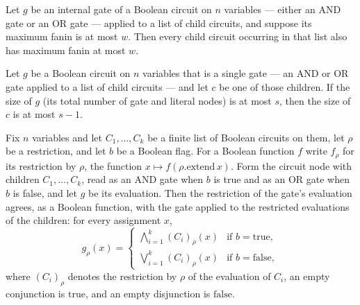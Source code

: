 \begin{lemma}
\label{LMN.children_maxFanin_le}
\leanok
{}
Let $g$ be an internal gate of a Boolean circuit on $n$ variables — either an AND gate
or an OR gate — applied to a list of child circuits, and suppose its maximum fanin is at
most $w$. Then every child circuit occurring in that list also has maximum fanin at most
$w$.
\end{lemma}

\begin{lemma}
\label{LMN.child_size_le_parent}
\leanok
{}
Let $g$ be a Boolean circuit on $n$ variables that is a single gate — an AND or OR gate
applied to a list of child circuits — and let $c$ be one of those children. If the size
of $g$ (its total number of gate and literal nodes) is at most $s$, then the size of $c$
is at most $s - 1$.
\end{lemma}

\begin{lemma}
\label{LMN.restrictFn_node_eval}
\leanok
{}
Fix $n$ variables and let $C_1,\dots,C_k$ be a finite list of Boolean circuits on them,
let $\rho$ be a restriction, and let $b$ be a Boolean flag. For a Boolean function $f$
write $f_\rho$ for its restriction by $\rho$, the function $x \mapsto
f(\rho.\mathrm{extend}\,x)$. Form the circuit node with children $C_1,\dots,C_k$, read
as an AND gate when $b$ is true and as an OR gate when $b$ is false, and let $g$ be its
evaluation. Then the restriction of the gate's evaluation agrees, as a Boolean function,
with the gate applied to the restricted evaluations of the children: for every
assignment $x$,
\[
g_\rho(x) =
\begin{cases}
\displaystyle\bigwedge_{i=1}^{k} (C_i)_\rho(x) & \text{if } b = \mathrm{true},\\[1ex]
\displaystyle\bigvee_{i=1}^{k} (C_i)_\rho(x) & \text{if } b = \mathrm{false},
\end{cases}
\]
where $(C_i)_\rho$ denotes the restriction by $\rho$ of the evaluation of $C_i$, an
empty conjunction is $\mathrm{true}$, and an empty disjunction is $\mathrm{false}$.
\end{lemma}


